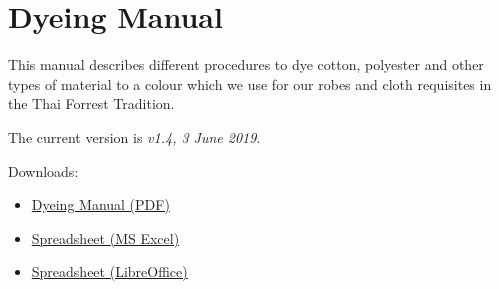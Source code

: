 \chapter{Dyeing Manual}

This manual describes different procedures to dye cotton, polyester and
other types of material to a colour which we use for our robes and cloth
requisites in the Thai Forrest Tradition.

The current version is \emph{v1.4, 3 June 2019}.

Downloads:

\begin{itemize}
\tightlist
\item
  \href{/dyeing-manual/Dyeing-Manual.pdf}{Dyeing Manual (PDF)}
\item
  \href{/dyeing-manual/Dyeing-Manual-Excel.xlsx}{Spreadsheet (MS Excel)}
\item
  \href{/dyeing-manual/Dyeing-Manual.ods}{Spreadsheet (LibreOffice)}
\end{itemize}

